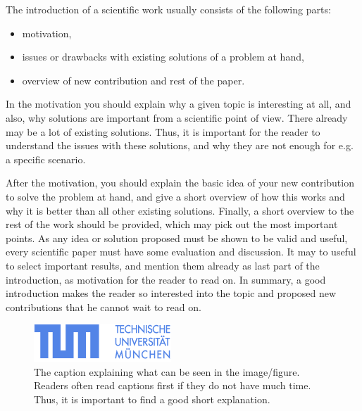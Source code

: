 \documentclass[A4,10pt]{article}
\begin{document}
\pagebreak
\label{introduction}

The introduction of a scientific work usually consists of the following
parts:

\begin{itemize}
	\item motivation,
	\item issues or drawbacks with existing solutions of a problem at 
hand,
	\item overview of new contribution and rest of the paper.
\end{itemize}

In the motivation you should explain why a given topic is interesting
at all, and also, why solutions are important from a scientific point
of view. There already may be a lot of existing solutions. Thus, it
is important for the reader to understand the issues with these solutions,
and why they are not enough for e.g. a specific scenario.

After the motivation, you should explain the basic idea of your new
contribution to solve the problem at hand, and give a short overview
of how this works and why it is better than all other existing solutions.
Finally, a short overview to the rest of the work should be provided,
which may pick out the most important points. As any idea or solution
proposed must be shown to be valid and useful, every scientific paper
must have some evaluation and discussion. It may to useful to select
important results, and mention them already as last part of the
introduction, as motivation for the reader to read on. In summary,
a good introduction makes the reader so interested into the topic and
proposed new contributions that he cannot wait to read on.

\begin{figure}
\centerline{
\includegraphics[width=0.9\columnwidth]{TUM-Logo-102.png}
}
\caption{The caption explaining what can be seen in the image/figure.
Readers often read captions first if they do not have much time. Thus,
it is important to find a good short explanation.}
\label{TUM}
\end{figure}
\end{document}

